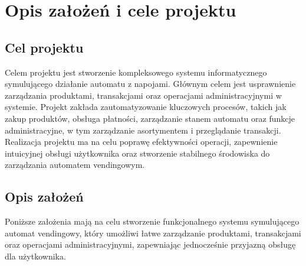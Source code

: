 \chapter{Opis założeń i cele projektu}
\section{Cel projektu}



Celem projektu jest stworzenie kompleksowego systemu informatycznego symulującego działanie automatu z napojami. Głównym celem jest usprawnienie zarządzania produktami, transakcjami oraz operacjami administracyjnymi w systemie. Projekt zakłada zautomatyzowanie kluczowych procesów, takich jak zakup produktów, obsługa płatności, zarządzanie stanem automatu oraz funkcje administracyjne, w tym zarządzanie asortymentem i przeglądanie transakcji. Realizacja projektu ma na celu poprawę efektywności operacji, zapewnienie intuicyjnej obsługi użytkownika oraz stworzenie stabilnego środowiska do zarządzania automatem vendingowym.



\section{Opis założeń}

Poniższe założenia mają na celu stworzenie funkcjonalnego systemu symulującego automat vendingowy, który umożliwi łatwe zarządzanie produktami, transakcjami oraz operacjami administracyjnymi, zapewniając jednocześnie przyjazną obsługę dla użytkownika.

